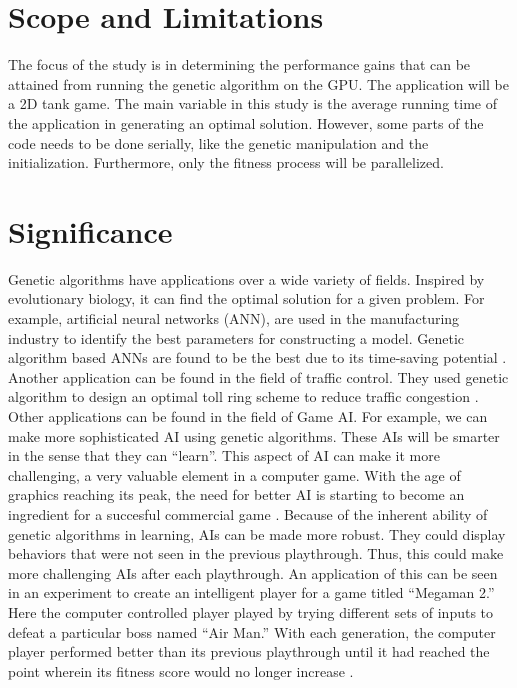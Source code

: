 \section{Scope and Limitations}

The focus of the study is in determining the performance gains that can be attained from
running the genetic algorithm on the GPU. The application will be a 2D tank game. The main 
variable in this study is the average running time of the application in generating 
an optimal solution. However, some parts of the code needs to be done serially, like the
genetic manipulation and the initialization. Furthermore, only the fitness process will be
parallelized.


\section{Significance}

Genetic algorithms have applications over a wide variety of fields.
Inspired by evolutionary biology, it can find the optimal solution
for a given problem. For example, artificial neural networks (ANN),
are used in the manufacturing industry to identify the best parameters
for constructing a model. Genetic algorithm based ANNs are found to be
the best due to its time-saving potential \cite{Venkatesan08}. Another
application can be found in the field of traffic control. They used
genetic algorithm to design an optimal toll ring scheme to reduce traffic
congestion \cite{Sumalee08}. Other applications can be found in the field
of Game AI. For example, we can make more sophisticated AI using genetic
algorithms. These AIs will be smarter in the sense that they can ``learn''.
This aspect of AI can make it more challenging, a very valuable element
in a computer game. With the age of graphics reaching its peak, the need
for better AI is starting to become an ingredient for a succesful
commercial game \cite{Yue06}. Because of the inherent ability of genetic
algorithms in learning, AIs can be made more robust. They could display
behaviors that were not seen in the previous playthrough. Thus, this
could make more challenging AIs after each playthrough. An application
of this can be seen in an experiment to create an intelligent player
for a game titled ``Megaman 2.'' Here the
computer controlled player played by trying different sets of inputs
to defeat a particular boss named ``Air Man.'' With each generation,
the computer player performed better than its previous playthrough
until it had reached the point wherein its fitness score would no longer
increase \cite{website:Kuliniewicz09}.


